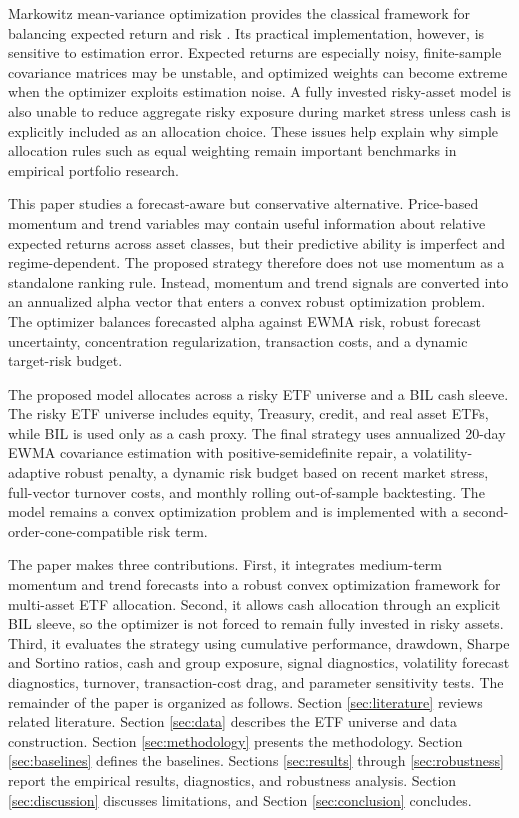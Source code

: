 \documentclass[11pt]{article}
\begin{document}
Markowitz mean-variance optimization provides the classical framework for balancing
expected return and risk \citep{markowitz1952}. Its practical implementation,
however, is sensitive to estimation error. Expected returns are especially noisy,
finite-sample covariance matrices may be unstable, and optimized weights can become
extreme when the optimizer exploits estimation noise. A fully invested risky-asset
model is also unable to reduce aggregate risky exposure during market stress unless
cash is explicitly included as an allocation choice. These issues help explain why
simple allocation rules such as equal weighting remain important benchmarks in
empirical portfolio research.

This paper studies a forecast-aware but conservative alternative. Price-based
momentum and trend variables may contain useful information about relative expected
returns across asset classes, but their predictive ability is imperfect and
regime-dependent. The proposed strategy therefore does not use momentum as a
standalone ranking rule. Instead, momentum and trend signals are converted into an
annualized alpha vector that enters a convex robust optimization problem. The
optimizer balances forecasted alpha against EWMA risk, robust forecast uncertainty,
concentration regularization, transaction costs, and a dynamic target-risk budget.

The proposed model allocates across a risky ETF universe and a BIL cash sleeve. The
risky ETF universe includes equity, Treasury, credit, and real asset ETFs, while BIL
is used only as a cash proxy. The final strategy uses annualized 20-day EWMA
covariance estimation with positive-semidefinite repair, a volatility-adaptive robust
penalty, a dynamic risk budget based on recent market stress, full-vector turnover
costs, and monthly rolling out-of-sample backtesting. The model remains a convex
optimization problem and is implemented with a second-order-cone-compatible risk
term.

The paper makes three contributions. First, it integrates medium-term momentum and
trend forecasts into a robust convex optimization framework for multi-asset ETF
allocation. Second, it allows cash allocation through an explicit BIL sleeve, so the
optimizer is not forced to remain fully invested in risky assets. Third, it evaluates
the strategy using cumulative performance, drawdown, Sharpe and Sortino ratios, cash
and group exposure, signal diagnostics, volatility forecast diagnostics, turnover,
transaction-cost drag, and parameter sensitivity tests. The remainder of the paper is
organized as follows. Section \ref{sec:literature} reviews related literature.
Section \ref{sec:data} describes the ETF universe and data construction. Section
\ref{sec:methodology} presents the methodology. Section \ref{sec:baselines} defines
the baselines. Sections \ref{sec:results} through \ref{sec:robustness} report the
empirical results, diagnostics, and robustness analysis. Section \ref{sec:discussion}
discusses limitations, and Section \ref{sec:conclusion} concludes.
\end{document}
